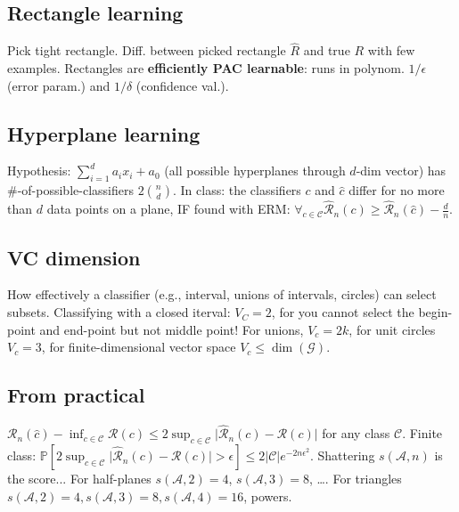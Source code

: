\subsection*{Rectangle learning}
Pick tight rectangle. Diff. between picked rectangle $\hat{R}$ and true $R$ with few examples. Rectangles are \textbf{efficiently PAC learnable}: runs in polynom. $1/\epsilon$ (error param.) and $1/\delta$ (confidence val.).
\subsection*{Hyperplane learning}
Hypothesis: $\sum_{i=1}^d a_ix_i + a_0$ (all possible hyperplanes through $d$-dim vector) has \#-of-possible-classifiers $2\binom{n}{d}$. In class: the classifiers $c$ and $\hat{c}$ differ for no more than $d$ data points on a plane, IF found with ERM: $\forall_{c\in\mathcal{C}} \hat{\mathcal{R}}_n(c) \geq \hat{\mathcal{R}}_n(\hat{c}) - \frac{d}{n}$.
\subsection*{VC dimension}
How effectively a classifier (e.g., interval, unions of intervals, circles) can select subsets. Classifying with a closed iterval: $V_C=2$, for you cannot select the begin-point and end-point but not middle point! For unions, $V_c=2k$, for unit circles $V_c=3$, for finite-dimensional vector space $V_c\leq\dim(\mathcal{G})$.
\subsection*{From practical}
$\mathcal{R}_n(\hat{c})-\inf_{c\in\mathcal{C}}\mathcal{R}(c) \leq 2\sup_{c\in\mathcal{C}}\lvert \hat{\mathcal{R}}_n(c) - \mathcal{R}(c) \rvert$ for any class $\mathcal{C}$. Finite class:
$\mathbb{P}[2\sup_{c\in\mathcal{C}}\lvert \hat{\mathcal{R}}_n(c) - \mathcal{R}(c) \rvert>\epsilon]\leq 2\lvert\mathcal{C}\rvert e^{-2n\epsilon^2}$.
Shattering $s(\mathcal{A},n)$ is the score... For half-planes $s(\mathcal{A},2)=4$, $s(\mathcal{A},3)=8$, \dots. For triangles $s(\mathcal{A},2)=4,s(\mathcal{A},3)=8,s(\mathcal{A},4)=16$, powers.

